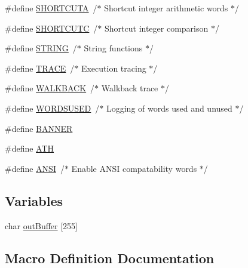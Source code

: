 \begin{DoxyCompactItemize}
\item 
\#define \hyperlink{freertos-atlcfig_8h_ae957ba08823687327a6f74f8ba99cf01}{S\+H\+O\+R\+T\+C\+U\+TA}~/$\ast$ Shortcut integer arithmetic words $\ast$/
\item 
\#define \hyperlink{freertos-atlcfig_8h_a7fb6c8bc5e9315d6ad8ecc8f29d22a9a}{S\+H\+O\+R\+T\+C\+U\+TC}~/$\ast$ Shortcut integer comparison $\ast$/
\item 
\#define \hyperlink{freertos-atlcfig_8h_a0f4d394a3ab4e09bff60f714c66dc5ee}{S\+T\+R\+I\+NG}~/$\ast$ String functions $\ast$/
\item 
\#define \hyperlink{freertos-atlcfig_8h_aad9cc64d45a76ba0d37c00f8cd9caa37}{T\+R\+A\+CE}~/$\ast$ Execution tracing $\ast$/
\item 
\#define \hyperlink{freertos-atlcfig_8h_a8a545fc997e24de1bdccb3454442ddee}{W\+A\+L\+K\+B\+A\+CK}~/$\ast$ Walkback trace $\ast$/
\item 
\#define \hyperlink{freertos-atlcfig_8h_a1832f63df1cc6543af5e3de731b77dac}{W\+O\+R\+D\+S\+U\+S\+ED}~/$\ast$ Logging of words used and unused $\ast$/
\item 
\#define \hyperlink{freertos-atlcfig_8h_a46c1fb0f4185dc45eda625530bc0fd73}{B\+A\+N\+N\+ER}
\item 
\#define \hyperlink{freertos-atlcfig_8h_a55fc4596d1f1291f82c8574e9e4a8369}{A\+TH}
\item 
\#define \hyperlink{freertos-atlcfig_8h_a9382b15380bf4f6adaafd94f1c78991a}{A\+N\+SI}~/$\ast$ Enable A\+N\+SI compatability words $\ast$/
\end{DoxyCompactItemize}
\subsection*{Variables}
\begin{DoxyCompactItemize}
\item 
char \hyperlink{freertos-atlcfig_8h_a2f25dee1596892b07e30dd78f5ebe81b}{out\+Buffer} \mbox{[}255\mbox{]}
\end{DoxyCompactItemize}


\subsection{Macro Definition Documentation}
\mbox{\label{freertos-atlcfig_8h_a9382b15380bf4f6adaafd94f1c78991a}} 
